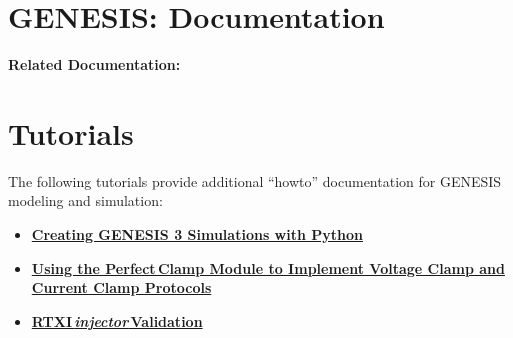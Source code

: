 \documentclass[12pt]{article}
\begin{document}
\section*{GENESIS: Documentation}

{\bf Related Documentation:}

\section*{Tutorials}

The following tutorials provide additional ``howto'' documentation for GENESIS modeling and simulation:
\begin{itemize}
   \item[]\href{../tutorial-python-scripting/tutorial-python-scripting.rst}
          {\bf Creating GENESIS 3 Simulations with Python}
   \item[]\href{../pclamp/pclamp.tex}{\bf Using the Perfect\,Clamp Module to Implement Voltage Clamp and Current Clamp Protocols}
   \item[]\href{../rtxi-injector-validation/rtxi-injector-validation.tex}{\bf RTXI\,{\it injector}\,Validation}
\end{itemize}
\end{document}
